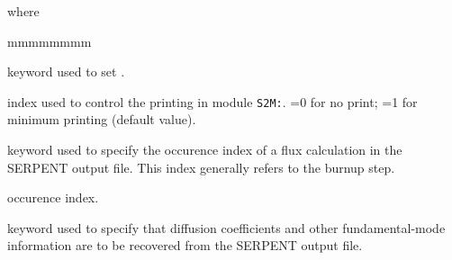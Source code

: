 \noindent where
\begin{ListeDeDescription}{mmmmmmmm}

\item[\moc{EDIT}] keyword used to set .

\item[\dusa{iprint}] index used to control the printing in module {\tt S2M:}. =0 for no print; =1 for minimum printing (default value).

\item[\moc{IDX}] keyword used to specify the occurence index of a flux calculation in the SERPENT output file. This index generally refers to the burnup step.

\item[\dusa{idx}] occurence index.

\item[\moc{B1}] keyword used to specify that diffusion coefficients and other fundamental-mode information are to be recovered from the SERPENT output file.

\end{ListeDeDescription}

\eject
